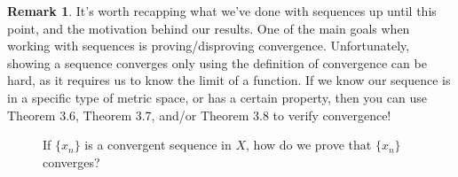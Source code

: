 \documentclass{article}
\newcommand{\R}{\mathbb{R}}
\theoremstyle{definition}
\newtheorem{remark}{Remark}[section]
\begin{document}
	\begin{remark}
		It's worth recapping what we've done with sequences up until this point, and the motivation behind our results. One of the main goals when working with sequences is proving/disproving convergence. Unfortunately, showing a sequence converges only using the definition of convergence can be hard, as it requires us to know the limit of a function. If we know our sequence is in a specific type of metric space, or has a certain property, then you can use Theorem 3.6, Theorem 3.7, and/or Theorem 3.8 to verify convergence! 
		\begin{figure}[h!]
			\caption{If $ \{x_n\} $ is a convergent sequence in $ X $, how do we prove that $ \{x_n\} $ converges?}
		\end{figure}
	\end{remark}
\end{document}
